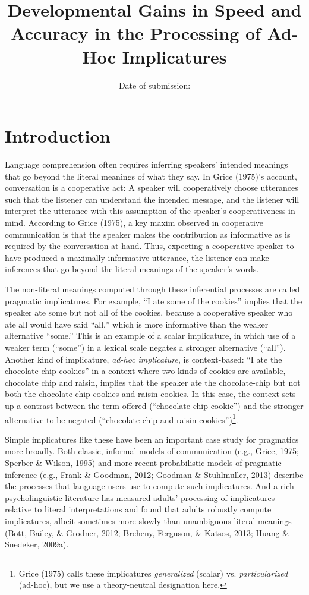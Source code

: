 \documentclass[a4paper,man,apacite,floatsintext]{apa6}
\date{}
\title{\textbf{Developmental Gains in Speed and Accuracy in the Processing of Ad-Hoc
Implicatures}}
\author{Date of submission:}
\affiliation{September 8, 2016}
\begin{document}
\maketitle

\section{Introduction}\label{introduction}

Language comprehension often requires inferring speakers' intended
meanings that go beyond the literal meanings of what they say. In Grice
(1975)'s account, conversation is a cooperative act: A speaker will
cooperatively choose utterances such that the listener can understand
the intended message, and the listener will interpret the utterance with
this assumption of the speaker's cooperativeness in mind. According to
Grice (1975), a key maxim observed in cooperative communication is that
the speaker makes the contribution as informative as is required by the
conversation at hand. Thus, expecting a cooperative speaker to have
produced a maximally informative utterance, the listener can make
inferences that go beyond the literal meanings of the speaker's words.

The non-literal meanings computed through these inferential processes
are called pragmatic implicatures. For example, ``I ate some of the
cookies'' implies that the speaker ate some but not all of the cookies,
because a cooperative speaker who ate all would have said ``all,'' which
is more informative than the weaker alternative ``some.'' This is an
example of a scalar implicature, in which use of a weaker term
(``some'') in a lexical scale negates a stronger alternative (``all'').
Another kind of implicature, \emph{ad-hoc implicature}, is
context-based: ``I ate the chocolate chip cookies'' in a context where
two kinds of cookies are available, chocolate chip and raisin, implies
that the speaker ate the chocolate-chip but not both the chocolate chip
cookies and raisin cookies. In this case, the context sets up a contrast
between the term offered (``chocolate chip cookie'') and the stronger
alternative to be negated (``chocolate chip and raisin
cookies'')\footnote{Grice (1975) calls these implicatures
  \emph{generalized} (scalar) vs. \emph{particularized} (ad-hoc), but we
  use a theory-neutral designation here.}.

Simple implicatures like these have been an important case study for
pragmatics more broadly. Both classic, informal models of communication
(e.g., Grice, 1975; Sperber \& Wilson, 1995) and more recent
probabilistic models of pragmatic inference (e.g., Frank \& Goodman,
2012; Goodman \& Stuhlmuller, 2013) describe the processes that language
users use to compute such implicatures. And a rich psycholinguistic
literature has measured adults' processing of implicatures relative to
literal interpretations and found that adults robustly compute
implicatures, albeit sometimes more slowly than unambiguous literal
meanings (Bott, Bailey, \& Grodner, 2012; Breheny, Ferguson, \& Katsos,
2013; Huang \& Snedeker, 2009a).
\end{document}
